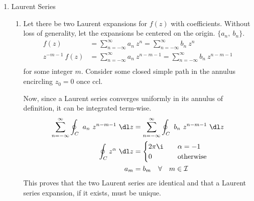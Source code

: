 \begin{enumerate}
    \item Laurent Series
          \begin{enumerate}
              \item Let there be two Laurent expansions for $ f(z) $ with coefficients.
                    Without loss of generality, let the expansions be centered on the
                    origin. $ \{a_n,\ b_n\} $.
                    \begin{align}
                        f(z)           & = \sum_{n = -\infty}^{\infty} a_n\ z^n =
                        \sum_{n = -\infty}^{\infty} b_n\ z^n                          \\
                        z^{-m-1}\ f(z) & = \sum_{n = -\infty}^{\infty} a_n\ z^{n-m-1}
                        = \sum_{n = -\infty}^{\infty} b_n\ z^{n-m-1}                  \\
                    \end{align}
                    for some integer $ m $. Consider some closed simple path in the
                    annulus encircling $ z_0 = 0 $ once ccl. \par
                    Now, since a Laurent series converges uniformly in its annulus of
                    definition, it can be integrated term-wise.
                    \begin{align}
                        \sum_{n = -\infty}^{\infty} \oint_C\ a_n\ z^{n-m-1}\ \dl z & =
                        \sum_{n = -\infty}^{\infty} \oint_C\ b_n\ z^{n-m-1}\ \dl z     \\
                        \oint_C z^\alpha\ \dl z                                    &
                        = \begin{cases}
                              2\pi\i & \quad \alpha = -1      \\
                              0      & \quad \text{otherwise} \\
                          \end{cases}                              \\
                        a_m                                                        &
                        = b_m \quad \forall \quad m \in \mathcal{I}
                    \end{align}
                    This proves that the two Laurent series are identical and that a
                    Laurent series expansion, if it exists, must be unique.


\end{enumerate}
\end{enumerate}
